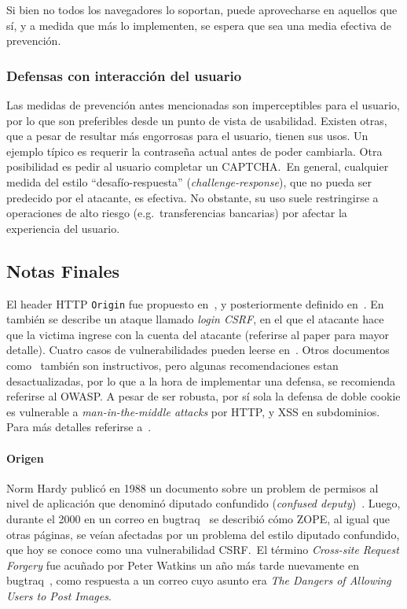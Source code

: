 \documentclass{article}
\theoremstyle{definition}
\begin{document}
Si bien no todos los navegadores lo soportan, puede aprovecharse en aquellos
que sí, y a medida que más lo implementen, se espera que sea una media efectiva
de prevención.

\subsubsection*{Defensas con interacción del usuario}
Las medidas de prevención antes mencionadas son imperceptibles para el usuario,
por lo que son preferibles desde un punto de vista de usabilidad. Existen otras,
que a pesar de resultar más engorrosas para el usuario, tienen sus usos. Un
ejemplo típico es requerir la contraseña actual antes de poder cambiarla. Otra
posibilidad es pedir al usuario completar un CAPTCHA.\ En general, cualquier
medida del estilo ``desafío-respuesta'' (\textit{challenge-response}), que no
pueda ser predecido por el atacante, es efectiva. No obstante, su uso suele
restringirse a operaciones de alto riesgo (e.g.\ transferencias bancarias) por afectar la
experiencia del usuario.

\subsection*{Notas Finales}

El header HTTP \texttt{Origin} fue propuesto en~\cite{Barth}, y posteriormente
definido en~\cite{rfc6454}. En~\cite{Barth} también se describe un ataque
llamado \textit{login CSRF}, en el que el atacante hace que la victima ingrese
con la cuenta del atacante (referirse al paper para mayor detalle).
Cuatro casos de vulnerabilidades pueden leerse en~\cite{Zeller}.
Otros documentos como~\cite{Burns,Blatz} también son instructivos, pero algunas
recomendaciones estan desactualizadas, por lo que a la hora de implementar una
defensa, se recomienda referirse al OWASP\@.
A pesar de ser robusta, por sí sola la defensa de doble cookie es vulnerable a
\textit{man-in-the-middle attacks} por HTTP, y XSS en subdominios.  Para más
detalles referirse a~\cite{Johansson}.

\paragraph{Origen} Norm Hardy publicó en 1988 un documento sobre un problem de
permisos al nivel de aplicación que denominó diputado confundido
(\textit{confused deputy})~\cite{Hardy}. Luego, durante el 2000 en un correo en
bugtraq~\cite{bugtraq} se describió cómo ZOPE, al igual que otras páginas, se
veían afectadas por un problema del estilo diputado confundido, que hoy se
conoce como una vulnerabilidad CSRF.\ El término \textit{Cross-site Request
Forgery} fue acuñado por Peter Watkins un año más tarde nuevamente en
bugtraq~\cite{watkins}, como respuesta a un correo cuyo asunto era \textit{The
Dangers of Allowing Users to Post Images}.


\end{document}
